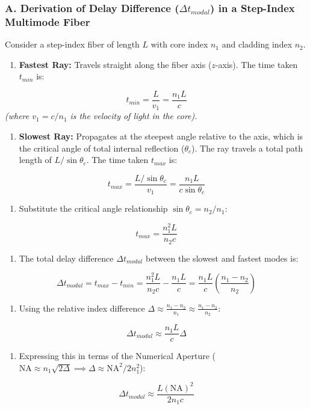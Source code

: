 \subsubsection{A. Derivation of Delay Difference ($\Delta t_{modal}$) in a Step-Index Multimode Fiber}
Consider a step-index fiber of length $L$ with core index $n_1$ and cladding index $n_2$.
\begin{enumerate}
  \item \textbf{Fastest Ray:} Travels straight along the fiber axis ($z$-axis). The time taken $t_{min}$ is:
\end{enumerate}
    \[ t_{min} = \frac{L}{v_1} = \frac{n_1 L}{c} \]
    \textit{(where $v_1 = c/n_1$ is the velocity of light in the core).}
\begin{enumerate}
  \item \textbf{Slowest Ray:} Propagates at the steepest angle relative to the axis, which is the critical angle of total internal reflection ($\theta_c$). The ray travels a total path length of $L / \sin\theta_c$. The time taken $t_{max}$ is:
\end{enumerate}
    \[ t_{max} = \frac{L / \sin\theta_c}{v_1} = \frac{n_1 L}{c \sin\theta_c} \]
\begin{enumerate}
  \item Substitute the critical angle relationship $\sin\theta_c = n_2/n_1$:
\end{enumerate}
    \[ t_{max} = \frac{n_1^2 L}{n_2 c} \]
\begin{enumerate}
  \item The total delay difference $\Delta t_{modal}$ between the slowest and fastest modes is:
\end{enumerate}
    \[ \Delta t_{modal} = t_{max} - t_{min} = \frac{n_1^2 L}{n_2 c} - \frac{n_1 L}{c} = \frac{n_1 L}{c} \left( \frac{n_1 - n_2}{n_2} \right) \]
\begin{enumerate}
  \item Using the relative index difference $\Delta \approx \frac{n_1 - n_2}{n_1} \approx \frac{n_1 - n_2}{n_2}$:
\end{enumerate}
    \[ \Delta t_{modal} \approx \frac{n_1 L}{c}\Delta \]
\begin{enumerate}
  \item Expressing this in terms of the Numerical Aperture ($\text{NA} \approx n_1\sqrt{2\Delta} \implies \Delta \approx \text{NA}^2 / 2n_1^2$):
\end{enumerate}
    \[ \Delta t_{modal} \approx \frac{L (\text{NA})^2}{2 n_1 c} \]

